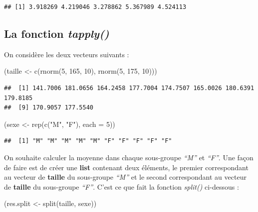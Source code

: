 \documentclass[
]{book}
\newenvironment{Shaded}{\begin{snugshade}}{\end{snugshade}}
\newcommand{\AttributeTok}[1]{\textcolor[rgb]{0.77,0.63,0.00}{#1}}
\newcommand{\DecValTok}[1]{\textcolor[rgb]{0.00,0.00,0.81}{#1}}
\newcommand{\FunctionTok}[1]{\textcolor[rgb]{0.00,0.00,0.00}{#1}}
\newcommand{\NormalTok}[1]{#1}
\newcommand{\OtherTok}[1]{\textcolor[rgb]{0.56,0.35,0.01}{#1}}
\newcommand{\StringTok}[1]{\textcolor[rgb]{0.31,0.60,0.02}{#1}}
\theoremstyle{definition}
\theoremstyle{definition}
\theoremstyle{definition}
\theoremstyle{definition}
\theoremstyle{remark}
\begin{document}
\begin{verbatim}
## [1] 3.918269 4.219046 3.278862 5.367989 4.524113
\end{verbatim}

\hypertarget{la-fonction-tapply}{%
\subsection{\texorpdfstring{La fonction \emph{tapply()}}{La fonction tapply()}}\label{la-fonction-tapply}}

On considère les deux vecteurs suivants :

\begin{Shaded}
\begin{Highlighting}[]
\NormalTok{(taille }\OtherTok{\textless{}{-}} \FunctionTok{c}\NormalTok{(}\FunctionTok{rnorm}\NormalTok{(}\DecValTok{5}\NormalTok{, }\DecValTok{165}\NormalTok{, }\DecValTok{10}\NormalTok{), }\FunctionTok{rnorm}\NormalTok{(}\DecValTok{5}\NormalTok{, }\DecValTok{175}\NormalTok{, }\DecValTok{10}\NormalTok{)))}
\end{Highlighting}
\end{Shaded}

\begin{verbatim}
##  [1] 141.7006 181.0656 164.2458 177.7004 174.7507 165.0026 180.6391 179.8185
##  [9] 170.9057 177.5540
\end{verbatim}

\begin{Shaded}
\begin{Highlighting}[]
\NormalTok{(sexe }\OtherTok{\textless{}{-}} \FunctionTok{rep}\NormalTok{(}\FunctionTok{c}\NormalTok{(}\StringTok{"M"}\NormalTok{, }\StringTok{"F"}\NormalTok{), }\AttributeTok{each =} \DecValTok{5}\NormalTok{))}
\end{Highlighting}
\end{Shaded}

\begin{verbatim}
##  [1] "M" "M" "M" "M" "M" "F" "F" "F" "F" "F"
\end{verbatim}

On souhaite calculer la moyenne dans chaque sous-groupe \emph{``M''} et \emph{``F''}. Une façon de faire est de créer une \textbf{list} contenant deux éléments, le premier correspondant au vecteur de \textbf{taille} du sous-groupe \emph{``M''} et le second correspondant au vecteur de \textbf{taille} du sous-groupe \emph{``F''}. C'est ce que fait la fonction \emph{split()} ci-dessous :

\begin{Shaded}
\begin{Highlighting}[]
\NormalTok{(res.split }\OtherTok{\textless{}{-}} \FunctionTok{split}\NormalTok{(taille, sexe))}
\end{Highlighting}
\end{Shaded}
\end{document}
